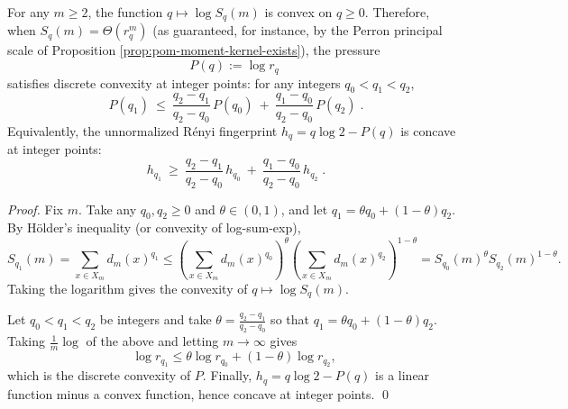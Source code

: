 \begin{proposition}\label{prop:pom-pressure-convexity}
For any \(m\ge 2\), the function \(q\mapsto \log S_q(m)\) is convex on \(q\ge 0\).
Therefore, when \(S_q(m)=\Theta(r_q^m)\) (as guaranteed, for instance, by the Perron principal scale of Proposition \ref{prop:pom-moment-kernel-exists}), the pressure
\[
P(q):=\log r_q
\]
satisfies discrete convexity at integer points: for any integers \(q_0<q_1<q_2\),
\[
\boxed{\;
P(q_1)\ \le\ \frac{q_2-q_1}{q_2-q_0}\,P(q_0)\ +\ \frac{q_1-q_0}{q_2-q_0}\,P(q_2)\; }.
\]
Equivalently, the unnormalized R\'enyi fingerprint \(h_q=q\log 2-P(q)\) is concave at integer points:
\[
\boxed{\;
h_{q_1}\ \ge\ \frac{q_2-q_1}{q_2-q_0}\,h_{q_0}\ +\ \frac{q_1-q_0}{q_2-q_0}\,h_{q_2}\; }.
\]
\end{proposition}
\begin{proof}
Fix \(m\). Take any \(q_0,q_2\ge 0\) and \(\theta\in(0,1)\), and let \(q_1=\theta q_0+(1-\theta)q_2\).
By H\"older's inequality (or convexity of log-sum-exp),
\[
S_{q_1}(m)=\sum_{x\in X_m}d_m(x)^{q_1}
\le
\left(\sum_{x\in X_m}d_m(x)^{q_0}\right)^{\theta}
\left(\sum_{x\in X_m}d_m(x)^{q_2}\right)^{1-\theta}
=S_{q_0}(m)^{\theta}S_{q_2}(m)^{1-\theta}.
\]
Taking the logarithm gives the convexity of \(q\mapsto \log S_q(m)\).
\par
Let \(q_0<q_1<q_2\) be integers and take
\(
\theta=\frac{q_2-q_1}{q_2-q_0}
\)
so that \(q_1=\theta q_0+(1-\theta)q_2\).
Taking \(\frac{1}{m}\log\) of the above and letting \(m\to\infty\) gives
\[
\log r_{q_1}\le \theta\log r_{q_0}+(1-\theta)\log r_{q_2},
\]
which is the discrete convexity of \(P\). Finally, \(h_q=q\log 2-P(q)\) is a linear function minus a convex function, hence concave at integer points. \qed
\end{proof}

